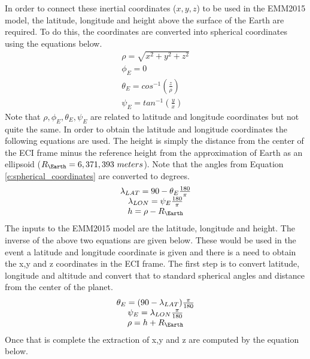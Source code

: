 \documentclass{article}
\begin{document}
\noindent In order to connect these inertial coordinates ($x,y,z$) to
be used in the EMM2015 model, the latitude, longitude and height above
the surface of the Earth are required. To do this, the coordinates are
converted into spherical coordinates using the equations below.
\begin{equation}\label{e:spherical_coordinates}
  \begin{matrix}
    \rho = \sqrt{x^2+y^2+z^2} \\
    \phi_E = 0 \\
    \theta_E = cos^{-1}\left( \frac{z}{\rho}\right) \\
    \psi_E = tan^{-1}\left( \frac{y}{x}\right)
  \end{matrix}
\end{equation}
Note that $\rho,\phi_E,\theta_E,\psi_E$ are related to latitude and
longitude coordinates but not quite the same. In order to obtain the
latitude and longitude coordinates the following equations are
used. The height is simply the distance from the center of the ECI
frame minus the reference height from the approximation of Earth as an
ellipsoid ($R_{\Earth}=6,371,393~meters$). Note that the angles from Equation
\ref{e:spherical_coordinates} are converted to degrees. 
\begin{equation}
  \begin{matrix}
    \lambda_{LAT} = 90 - \theta_E\frac{180}{\pi}\\
    \lambda_{LON} = \psi_E\frac{180}{\pi} \\
    h = \rho - R_{\Earth}
  \end{matrix}
\end{equation}
The inputs to the EMM2015 model are the latitude, longitude and height. The inverse of the above two equations are given below. These would be used in the event a latitude and longitude coordinate is given and there is a need to obtain the x,y and z coordinates in the ECI frame. The first step is to convert latitude, longitude and altitude and convert that to standard spherical angles and distance from the center of the planet.
\begin{equation}
\begin{matrix}
\theta_E = (90 - \lambda_{LAT})\frac{\pi}{180}\\
\psi_E = \lambda_{LON}\frac{\pi}{180}\\
\rho = h + R_{\Earth}
\end{matrix}
\end{equation}
Once that is complete the extraction of x,y and z are computed by the equation below.
\end{document}
